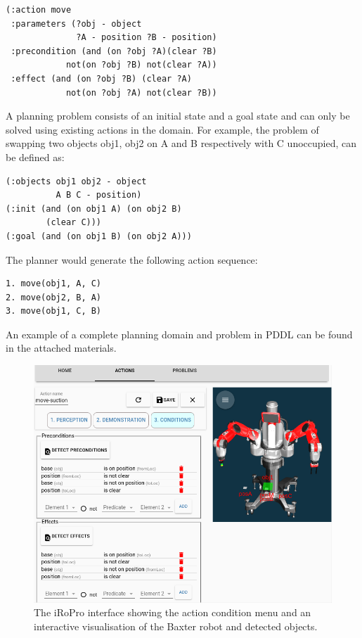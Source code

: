 \begin{verbatim}
(:action move
 :parameters (?obj - object 
              ?A - position ?B - position)
 :precondition (and (on ?obj ?A)(clear ?B)
            not(on ?obj ?B) not(clear ?A))
 :effect (and (on ?obj ?B) (clear ?A)
            not(on ?obj ?A) not(clear ?B))
\end{verbatim}

A planning problem consists of an initial state and a goal state and can only be solved using existing actions in the domain.
For example, the problem of swapping two objects obj1, obj2 on A and B respectively with C unoccupied, can be defined as:
\begin{verbatim}
(:objects obj1 obj2 - object
          A B C - position)
(:init (and (on obj1 A) (on obj2 B) 
        (clear C)))
(:goal (and (on obj1 B) (on obj2 A)))
\end{verbatim}
The planner would generate the following action sequence:
\begin{verbatim}
1. move(obj1, A, C)
2. move(obj2, B, A)
3. move(obj1, C, B)
\end{verbatim}
An example of a complete planning domain and problem in PDDL can be found in the attached materials.

\begin{figure}[t]
\includegraphics[width=\linewidth]{figures/gui.png}
    \caption{The iRoPro interface showing the action condition menu and an interactive visualisation of the Baxter robot and detected objects.}\label{fig:gui-action-3}%
\end{figure}



